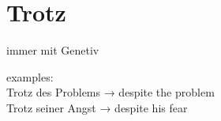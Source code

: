 \documentclass[a4paper]{article}
\title{}
\date{}
\begin{document}
    \maketitle
    \section{Trotz}
    immer mit Genetiv
    
    examples:\\
    Trotz des Problems → despite the problem\\
    Trotz seiner Angst → despite his fear
\end{document}

